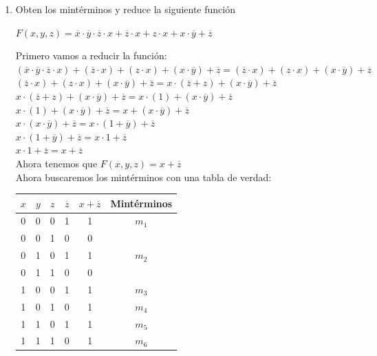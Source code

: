 \documentclass[a4paper,12pt]{article}
\begin{document}
\begin{enumerate}[label=\textcolor{teal}{\textbf{\arabic*.}}]

    \item Obten los mintérminos y reduce la siguiente función 
        \begin{center}
            $F(x,y,z) = \overline{x} \cdot \overline{y} \cdot \overline{z} \cdot x + \overline{z} \cdot x + z \cdot x + x \cdot \overline{y} + \overline{z} $
        \end{center}
        Primero vamos a reducir la función:\\
        $(\overline{x} \cdot \overline{y} \cdot \overline{z} \cdot x) + (\overline{z} \cdot x) + (z \cdot x) + (x \cdot \overline{y}) + \overline{z} = (\overline{z} \cdot x) + (z \cdot x) + (x \cdot \overline{y}) + \overline{z} $\\
        $(\overline{z} \cdot x) + (z \cdot x) + (x \cdot \overline{y}) + \overline{z} = x \cdot (\overline{z} + z) + (x \cdot \overline{y}) + \overline{z} $ \\
        $x \cdot (\overline{z} + z) + (x \cdot \overline{y}) + \overline{z} = x \cdot (1) + (x \cdot \overline{y}) + \overline{z} $\\
        $x \cdot (1) + (x \cdot \overline{y}) + \overline{z} = x + (x \cdot \overline{y}) + \overline{z} $\\
        $x \cdot (x \cdot \overline{y}) + \overline{z} = x \cdot (1 + \overline{y}) + \overline{z}$\\
        $x \cdot (1 + \overline{y}) + \overline{z} = x \cdot 1 + \overline{z}$\\
        $x \cdot 1 + \overline{z} = x + \overline{z}$\\
        Ahora tenemos que $F(x,y,z) = x + \overline{z}$\\
        Ahora buscaremos los mintérminos con una tabla de verdad:\\
        \begin{table} [H]
            \centering
            \begin{tabular}{|c|c|c|c|c|c|}
                \hline
                $x$ & $y$ & $z$ & $\overline{z}$ & $x + \overline{z}$ & Mintérminos\\ \hline
                0 & 0 & 0 & 1 & 1 & $m_{1}$\\ \hline
                0 & 0 & 1 & 0 & 0 & \\ \hline
                0 & 1 & 0 & 1 & 1 & $m_{2}$\\ \hline
                0 & 1 & 1 & 0 & 0 & \\ \hline
                1 & 0 & 0 & 1 & 1 & $m_{3}$\\ \hline
                1 & 0 & 1 & 0 & 1 & $m_{4}$\\ \hline
                1 & 1 & 0 & 1 & 1 & $m_{5}$\\ \hline
                1 & 1 & 1 & 0 & 1 & $m_{6}$\\ \hline
            \end{tabular}
        \end{table}


\end{enumerate}
\end{document}
